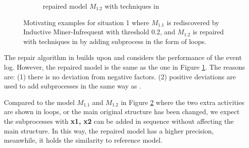 \begin{figure}[htp]
\begin{subfigure}[b]{0.48\textwidth}
		\caption{repaired model $M_{1.2}$ with techniques in \cite{fahland2015model}}
		\label{fig:demo_s1_fahland}
	\end{subfigure}%
	\caption[Motivating examples for situation 1]{Motivating examples for situation 1 where $M_{1.1}$ is rediscovered by Inductive Miner-Infrequent with threshold 0.2, and $M_{1.2}$ is repaired with techniques in \cite{fahland2015model} by adding subprocess in the form of loops.}
	\label{fig:demo_s1}
\end{figure}

The repair algorithm in  \cite{dees2017enhancing} builds upon  \cite{fahland2015model} and considers the performance of the event log. However, the repaired model is the same as the one in Figure \ref{fig:demo_s1_fahland}. The reasons are: (1) there is no deviation from negative factors. (2) positive deviations are used to add subprocesses in the same way as  \cite{fahland2015model}. 


Compared to the model $M_{1.1}$ and $M_{1.2}$ in Figure \ref{fig:demo_s1} where the two extra activities are shown in loops, or the main original structure has been changed, we expect the subprocesses with \textbf{x1, x2} can be added in sequence without affecting the main structure. In this way, the repaired model has a higher precision, meanwhile, it holds the similarity to reference model. %

